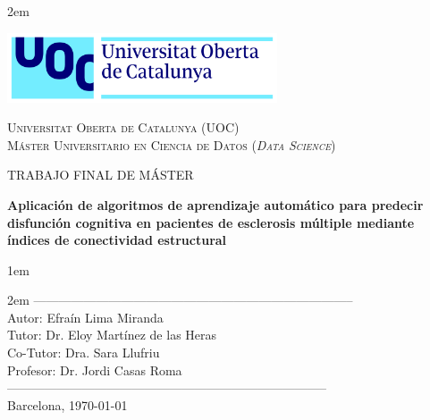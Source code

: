 \newpage
\thispagestyle{empty}

\baselineskip 2em


\centerline {\includegraphics[width=0.6\textwidth]{figs/UOC-logo}}
\begin{center}
\textsc{Universitat Oberta de Catalunya (UOC) \\
 Máster Universitario en Ciencia de Datos (\textit{Data Science})\\}


\vspace*{1.5cm}

\textsc{\Large TRABAJO FINAL DE MÁSTER}


\vspace*{1.5cm}

\textbf{\Large Aplicación de algoritmos de aprendizaje automático para predecir disfunción cognitiva en pacientes de esclerosis múltiple mediante índices de conectividad estructural}


\vspace{2.5cm}
\baselineskip 1em

\vspace{1cm}
\baselineskip 2em
-----------------------------------------------------------------------------\\
Autor:      Efraín Lima Miranda\\
Tutor:   Dr. Eloy Martínez de las Heras\\
Co-Tutor:   Dra. Sara Llufriu\\
Profesor: Dr. Jordi Casas Roma\\

-----------------------------------------------------------------------------\\
\vspace*{1.0cm}
Barcelona, \today

\end{center}

